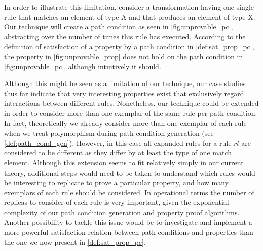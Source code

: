 In order to illustrate this limitation, consider a transformation having one single rule that matches an element of type A and that produces an element of type X. Our technique will create a path condition as seen in \cref{fig:unprovable_pc}, abstracting over the number of times this rule has executed. According to the definition of satisfaction of a property by a path condition in \cref{def:sat_prop_pc}, the property in \cref{fig:unprovable_prop} does not hold on the path condition in \cref{fig:unprovable_pc}, although intuitively it should.


Although this might be seen as a limitation of our technique, our case studies thus far indicate that very interesting properties exist that exclusively regard interactions between different rules. Nonetheless, our technique could be extended in order to consider more than one exemplar of the same rule per path condition. In fact, theoretically we already consider more than one exemplar of each rule when we treat polymorphism during path condition generation (see \cref{def:path_cond_gen}). However, in this case all expanded rules for a rule $rl$ are considered to be different as they differ by at least the type of one match element. Although this extension seems to fit relatively simply in our current theory, additional steps would need to be taken to understand which rules would be interesting to replicate to prove a particular property, and how many exemplars of each rule should be considered. In operational terms the number of replicas to consider of each rule is very important, given the exponential complexity of our path condition generation and property proof algorithms. Another possibility to tackle this issue would be to investigate and implement a more powerful satisfaction relation between path conditions and properties than the one we now present in \cref{def:sat_prop_pc}.



